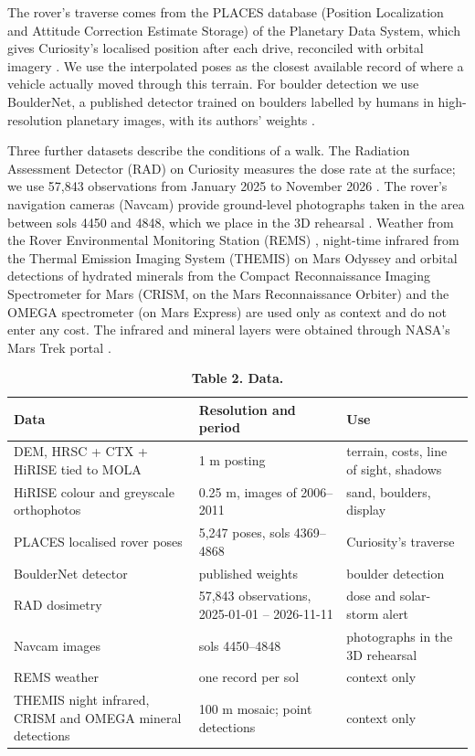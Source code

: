 \documentclass[11pt,a4paper]{article}
\begin{document}
The rover's traverse comes from the PLACES database (Position Localization and Attitude Correction Estimate Storage) of the Planetary Data System, which gives Curiosity's localised position after each drive, reconciled with orbital imagery \cite{PLACES}. We use the interpolated poses as the closest available record of where a vehicle actually moved through this terrain. For boulder detection we use BoulderNet, a published detector trained on boulders labelled by humans in high-resolution planetary images, with its authors' weights \cite{Prieur2023}.

Three further datasets describe the conditions of a walk. The Radiation Assessment Detector (RAD) on Curiosity measures the dose rate at the surface; we use 57,843 observations from January 2025 to November 2026 \cite{RAD-L2}. The rover's navigation cameras (Navcam) provide ground-level photographs taken in the area between sols 4450 and 4848, which we place in the 3D rehearsal \cite{MSL-raw}. Weather from the Rover Environmental Monitoring Station (REMS) \cite{REMS-feed}, night-time infrared from the Thermal Emission Imaging System (THEMIS) on Mars Odyssey \cite{THEMIS-night} and orbital detections of hydrated minerals from the Compact Reconnaissance Imaging Spectrometer for Mars (CRISM, on the Mars Reconnaissance Orbiter) and the OMEGA spectrometer (on Mars Express) are used only as context and do not enter any cost. The infrared and mineral layers were obtained through NASA's Mars Trek portal \cite{MarsTrek}.

\begin{table}[H]
\centering\small
\caption{\textbf{Table 2. Data.}}
\begin{tabular}{lll}
\toprule
Data & Resolution and period & Use \\
\midrule
DEM, HRSC + CTX + HiRISE tied to MOLA \cite{Parker2016} & 1 m posting & terrain, costs, line of sight, shadows \\
HiRISE colour and greyscale orthophotos \cite{HiRISE-Gale} & 0.25 m, images of 2006--2011 & sand, boulders, display \\
PLACES localised rover poses \cite{PLACES} & 5,247 poses, sols 4369--4868 & Curiosity's traverse \\
BoulderNet detector \cite{Prieur2023} & published weights & boulder detection \\
RAD dosimetry \cite{RAD-L2} & 57,843 observations, 2025-01-01 -- 2026-11-11 & dose and solar-storm alert \\
Navcam images \cite{MSL-raw} & sols 4450--4848 & photographs in the 3D rehearsal \\
REMS weather \cite{REMS-feed} & one record per sol & context only \\
THEMIS night infrared, CRISM and OMEGA mineral detections \cite{THEMIS-night,MarsTrek} & 100 m mosaic; point detections & context only \\
\bottomrule
\end{tabular}
\end{table}
\end{document}
